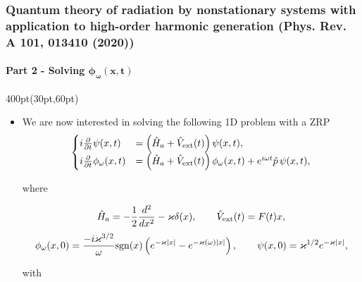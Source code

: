 \begin{frame}
\frametitle{Quantum theory of radiation by nonstationary systems 
	with application to high-order harmonic generation
        (Phys. Rev. A 101, 013410 (2020))}
        \framesubtitle{Part 2 - Solving $\boldsymbol{\phi_\omega(x,t)}$}
\footnotesize
\begin{textblock*}{400pt}(30pt,60pt)
\begin{itemize}
\item We are now interested in solving 
the following 1D problem with a ZRP
\begin{align}
\begin{cases}
	i\frac{\partial}{\partial t}\psi(x,t)
	   & = \left( \hat{H}_a + \hat{V}_{\rm ext}(t)\right) 
	   \psi(x,t),\\
	i\frac{\partial}{\partial t}\phi_\omega(x,t)
	   & = \left( \hat{H}_a + \hat{V}_{\rm ext}(t)\right) 
	   \phi_\omega (x,t)
 	   + e^{i\omega t} {\hat{p}}\,
	   \psi(x,t), \label{eqn:main_1d} 
\end{cases}
\end{align}

where

\begin{equation}
  \hat{H}_a = -\frac{1}{2}\frac{d^2}{dx^2} - \varkappa\delta(x), 
\hspace{20pt}  \hat{V}_{\rm ext}(t) = F(t)x,
\end{equation}
\begin{equation}
  \phi_\omega (x,0) = \frac{-i\varkappa^{3/2}}{\omega}
{\rm sgn}(x)\left(e^{-\varkappa|x|} - e^{-\varkappa(\omega)|x|}\right), 
\hspace{20pt}  \psi(x,0) = \varkappa^{1/2}e^{-\varkappa|x|}, 
\label{eqn:bound_state0}
\end{equation}

with


\end{itemize}
\end{textblock*}
\end{frame}
